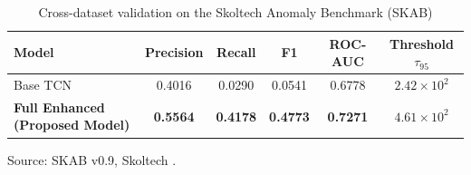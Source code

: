\begin{table}[H]
\centering
\caption{Cross-dataset validation on the Skoltech Anomaly Benchmark (SKAB)}
\label{table:skab_results}
\small
\renewcommand{\arraystretch}{1.1}
\begin{tabular}{lccccc}
\toprule
\textbf{Model} & \textbf{Precision} & \textbf{Recall} & \textbf{F1} & \textbf{ROC-AUC} & \textbf{Threshold $\tau_{95}$} \\
\midrule
Base TCN      & 0.4016 & 0.0290 & 0.0541 & 0.6778 & $2.42\times 10^{2}$ \\
\textbf{Full Enhanced (Proposed Model)} & \textbf{0.5564} & \textbf{0.4178} & \textbf{0.4773} & \textbf{0.7271} & $4.61\times 10^{2}$ \\
\bottomrule
\end{tabular}
\begin{flushleft}
\footnotesize Source: SKAB v0.9, Skoltech \cite{skab_dataset}.
\end{flushleft}
\end{table}
